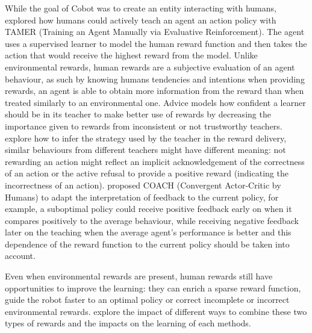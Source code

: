 While the goal of Cobot was to create an entity interacting with humans, \cite{knox2009interactively} explored how humans could actively teach an agent an action policy with TAMER (Training an Agent Manually via Evaluative Reinforcement). The agent uses a supervised learner to model the human reward function and then takes the action that would receive the highest reward from the model. Unlike environmental rewards, human rewards are a subjective evaluation of an agent behaviour, as such by knowing humans tendencies and intentions when providing rewards, an agent is able to obtain more information from the reward than when treated similarly to an environmental one. Advice \citep{griffith2013policy} models how confident a learner should be in its teacher to make better use of rewards by decreasing the importance given to rewards from inconsistent or not trustworthy teachers. \cite{loftin2016learning} explore how to infer the strategy used by the teacher in the reward delivery, similar behaviours from different teachers might have different meaning: not rewarding an action might reflect an implicit acknowledgement of the correctness of an action or the active refusal to provide a positive reward (indicating the incorrectness of an action). \cite{macglashan2017interactive} proposed COACH (Convergent Actor-Critic by Humans) to adapt the interpretation of feedback to the current policy, for example, a suboptimal policy could receive positive feedback early on when it compares positively to the average behaviour, while receiving negative feedback later on the teaching when the average agent's performance is better and this dependence of the reward function to the current policy should be taken into account.

Even when environmental rewards are present, human rewards still have opportunities to improve the learning: they can enrich a sparse reward function, guide the robot faster to an optimal policy or correct incomplete or incorrect environmental rewards. \cite{knox2010combining} explore the impact of different ways to combine these two types of rewards and the impacts on the learning of each methods.



